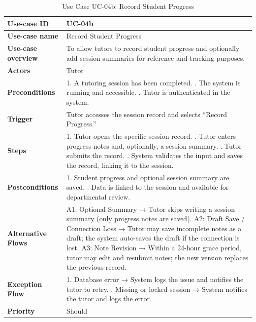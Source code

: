 \begin{table}[h!]
\centering
\begin{tabular}{|p{3cm}|p{11cm}|}
\hline
\textbf{Use-case ID} & UC-04b \\
\hline
\textbf{Use-case name} & Record Student Progress \\
\hline
\textbf{Use-case overview} & To allow tutors to record student progress and optionally add session summaries for reference and tracking purposes. \\
\hline
\textbf{Actors} & Tutor \\
\hline
\textbf{Preconditions} & 
1. A tutoring session has been completed. \newline
2. The system is running and accessible. \newline
3. Tutor is authenticated in the system. \\
\hline
\textbf{Trigger} & Tutor accesses the session record and selects “Record Progress.” \\
\hline
\textbf{Steps} & 
1. Tutor opens the specific session record. \newline
2. Tutor enters progress notes and, optionally, a session summary. \newline
3. Tutor submits the record. \newline
4. System validates the input and saves the record, linking it to the session. \\
\hline
\textbf{Postconditions} & 
1. Student progress and optional session summary are saved. \newline
2. Data is linked to the session and available for departmental review. \\
\hline
\textbf{Alternative Flows} & 
A1: Optional Summary → Tutor skips writing a session summary (only progress notes are saved). \newline
A2: Draft Save / Connection Loss → Tutor may save incomplete notes as a draft; the system auto-saves the draft if the connection is lost. \newline
A3: Note Revision → Within a 24-hour grace period, tutor may edit and resubmit notes; the new version replaces the previous record. \\
\hline
\textbf{Exception Flow} & 
1. Database error → System logs the issue and notifies the tutor to retry. \newline
2. Missing or locked session → System notifies the tutor and logs the error. \\
\hline
\textbf{Priority} & Should \\
\hline
\end{tabular}
\caption{Use Case UC-04b: Record Student Progress}
\end{table}

